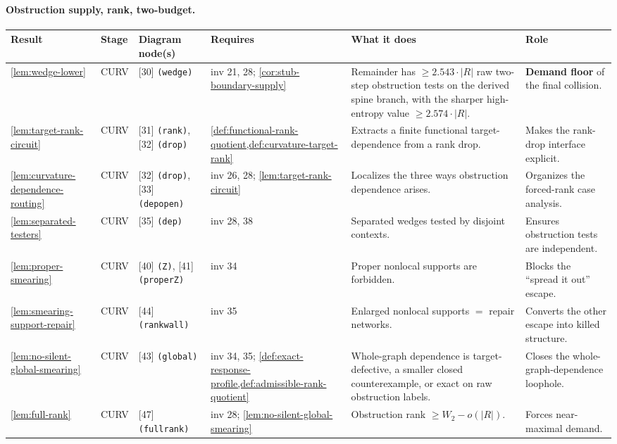 \documentclass[11pt]{article}
\begin{document}
\paragraph{Obstruction supply, rank, two-budget.}
{\scriptsize\setlength{\tabcolsep}{3pt}
\begin{longtable}{L{0.10\textwidth} C{0.045\textwidth} L{0.13\textwidth} L{0.135\textwidth} L{0.28\textwidth} L{0.20\textwidth}}
\toprule
\textbf{Result} & \textbf{Stage} & \textbf{Diagram node(s)} & \textbf{Requires} & \textbf{What it does} & \textbf{Role} \\
\midrule
\endhead
\cref{lem:wedge-lower} & CURV & [30] \texttt{(wedge)} & inv 21, 28; \cref{cor:stub-boundary-supply} & Remainder has $\ge2.543\cdot|R|$ raw two-step obstruction tests on the derived spine branch, with the sharper high-entropy value $\ge2.574\cdot|R|$. & \textbf{Demand floor} of the final collision. \\
\cref{lem:target-rank-circuit} & CURV & [31] \texttt{(rank)}, [32] \texttt{(drop)} & \cref{def:functional-rank-quotient,def:curvature-target-rank} & Extracts a finite functional target-dependence from a rank drop. & Makes the rank-drop interface explicit. \\
\cref{lem:curvature-dependence-routing} & CURV & [32] \texttt{(drop)}, [33] \texttt{(depopen)} & inv 26, 28; \cref{lem:target-rank-circuit} & Localizes the three ways obstruction dependence arises. & Organizes the forced-rank case analysis. \\
\cref{lem:separated-testers} & CURV & [35] \texttt{(dep)} & inv 28, 38 & Separated wedges tested by disjoint contexts. & Ensures obstruction tests are independent. \\
\cref{lem:proper-smearing} & CURV & [40] \texttt{(Z)}, [41] \texttt{(properZ)} & inv 34 & Proper nonlocal supports are forbidden. & Blocks the ``spread it out'' escape. \\
\cref{lem:smearing-support-repair} & CURV & [44] \texttt{(rankwall)} & inv 35 & Enlarged nonlocal supports $=$ repair networks. & Converts the other escape into killed structure. \\
\cref{lem:no-silent-global-smearing} & CURV & [43] \texttt{(global)} & inv 34, 35; \cref{def:exact-response-profile,def:admissible-rank-quotient} & Whole-graph dependence is target-defective, a smaller closed counterexample, or exact on raw obstruction labels. & Closes the whole-graph-dependence loophole. \\
\cref{lem:full-rank} & CURV & [47] \texttt{(fullrank)} & inv 28; \cref{lem:no-silent-global-smearing} & Obstruction rank $\ge W_2-o(|R|)$. & Forces near-maximal demand. \\

\end{longtable}}
\end{document}
